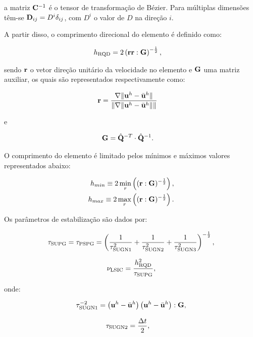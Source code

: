 \documentclass[tese_patricia]{subfiles}%
\begin{document}
\noindent a matriz $\mathbf{C}^{-1}$ é o tensor de transformação de Bézier. Para múltiplas dimensões têm-se $\mathbf{D}_{ij} = D^i \delta_{ij} $, com $D^i$ o valor de $D$ na direção $i$.

A partir disso, o comprimento direcional do elemento é definido como:

\begin{align}
h_{\mathrm{RQD}} &=2\left(\mathbf{r}\mathbf{r} : \mathbf{G} \right)^{-\frac{1}{2}},
\end{align}

\noindent sendo $\mathbf{r}$ o vetor direção unitário da velocidade no elemento e $\mathbf{G}$ uma matriz auxiliar, os quais são representados respectivamente como:

\begin{align}
\mathbf{r}&=\frac{\nabla \lVert\mathbf{u}^h - \bar{\mathbf{u}}^h\rVert}{\lVert \nabla \lVert\mathbf{u}^h - \bar{\mathbf{u}}^h\rVert\rVert} \label{eq:erRGN}
\end{align}

\noindent e

\begin{align}
\mathbf{G} &= \hat{\mathbf{Q}}^{-T} \cdot \hat{\mathbf{Q}}^{-1}. 
\end{align}

O comprimento do elemento é limitado pelos mínimos e máximos valores representados abaixo:

\begin{align}
h_{min} \equiv 2\min_{r}\left((\mathbf{r}:\mathbf{G})^{-\frac{1}{2}} \right), \\
h_{max} \equiv 2\max_{r}\left((\mathbf{r}:\mathbf{G})^{-\frac{1}{2}} \right).
\end{align}

Os parâmetros de estabilização são dados por:

\begin{align}
\tau_{\mathrm{SUPG}} = \tau_{\mathrm{PSPG}} =\left(\frac{1}{\tau_{\mathrm{SUGN1}}^2} + \frac{1}{\tau_{\mathrm{SUGN2}}^2} + \frac{1}{\tau_{\mathrm{SUGN3}}^2} \right)^{-\frac{1}{2}},
\end{align}

\begin{align}
\nu_{\mathrm{LSIC}} = \frac{h_{\mathrm{RQD}}^2}{\tau_{\mathrm{SUPG}}},
\end{align}

\noindent onde:

\begin{align}
\tau_{\mathrm{SUGN1}}^{-2} = \left(\mathbf{u}^h - \bar{\mathbf{u}}^h \right) \left(\mathbf{u}^h - \bar{\mathbf{u}}^h \right) : \mathbf{G} ,
\end{align}

\begin{align}
\tau_{\mathrm{SUGN2}}&=\frac{\Delta t}{2},
\end{align}
\end{document}
